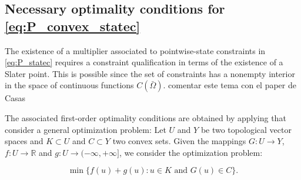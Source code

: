 \documentclass[11pt,a4paper]{amsart}
\renewcommand{\l}{\left}
\renewcommand{\r}{\right}
\newcommand{\om}{\Omega}
\begin{document}
\subsection{Necessary optimality conditions for \eqref{eq:P_convex_statec}}  
The existence of a multiplier associated to pointwise-state constraints in \eqref{eq:P_statec} requires a constraint qualification in terms of the existence of a Slater point. This is possible since the set of constraints has a nonempty interior in the space of continuous functions $C(\bar \om)$. {\color{red} comentar este tema con el paper de Casas}


The associated first-order optimality conditions are obtained by applying \cite[Theorem 3.2]{Casas_2020} that consider a general optimization problem: Let \( U \) and \( Y \) be two topological vector spaces and \( K \subset U \) and \( C \subset Y \) two convex sets. Given the mappings \( G : U \rightarrow Y \), \( f : U \rightarrow \mathbb{R} \) and \( g : U \rightarrow (-\infty, +\infty] \), we consider the optimization problem:

\[
\tag{Q} \min \{ f(u) + g(u) : u \in K \text{ and } G(u) \in C \}.
\]
\end{document}
